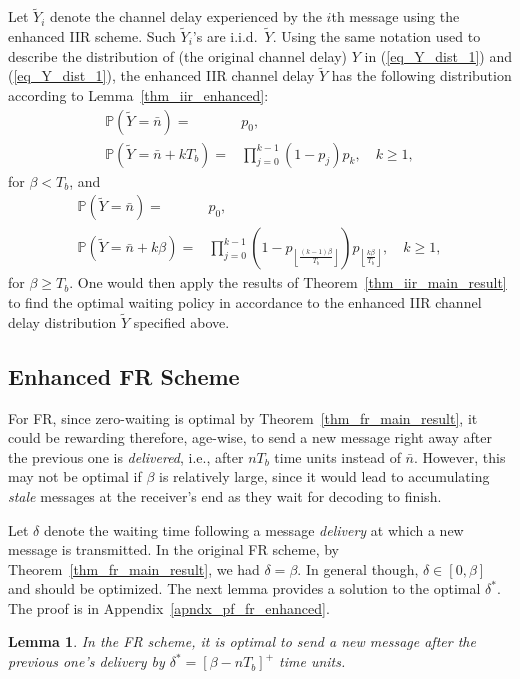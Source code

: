 \documentclass[12pt,journal,onecolumn]{IEEEtran}
\newtheorem{lemma}{Lemma}
\begin{document}
Let $\tilde{Y}_i$ denote the channel delay experienced by the $i$th message using the enhanced IIR scheme. Such $\tilde{Y}_i$'s are i.i.d.~$\tilde{Y}$. Using the same notation used to describe the distribution of (the original channel delay) $Y$ in (\ref{eq_Y_dist_1}) and (\ref{eq_Y_dist_1}), the enhanced IIR channel delay $\tilde{Y}$ has the following distribution according to Lemma~\ref{thm_iir_enhanced}:
\begin{align}
\mathbb{P}\left(\tilde{Y}=\bar{n}\right)=&p_0, \\
\mathbb{P}\left(\tilde{Y}=\bar{n}+kT_b\right)=&\prod_{j=0}^{k-1}(1-p_j)p_k,\quad k\geq1,
\end{align}
for $\beta<T_b$, and
\begin{align}
\mathbb{P}\left(\tilde{Y}=\bar{n}\right)=&p_0, \\
\mathbb{P}\left(\tilde{Y}=\bar{n}+k\beta\right)=&\prod_{j=0}^{k-1}\left(1-p_{\left\lfloor \frac{(k-1)\beta}{T_b} \right\rfloor}\right)p_{\left\lfloor \frac{k\beta}{T_b} \right\rfloor},\quad k\geq1,
\end{align}
for $\beta\geq T_b$. One would then apply the results of Theorem~\ref{thm_iir_main_result} to find the optimal waiting policy in accordance to the enhanced IIR channel delay distribution $\tilde{Y}$ specified above.


\subsection{Enhanced FR Scheme}

For FR, since zero-waiting is optimal by Theorem~\ref{thm_fr_main_result}, it could be rewarding therefore, age-wise, to send a new message right away after the previous one is {\it delivered}, i.e., after $nT_b$ time units instead of $\bar{n}$. However, this may not be optimal if $\beta$ is relatively large, since it would lead to accumulating {\it stale} messages at the receiver's end as they wait for decoding to finish. 

Let $\delta$ denote the waiting time following a message {\it delivery} at which a new message is transmitted. In the original FR scheme, by Theorem~\ref{thm_fr_main_result}, we had $\delta=\beta$. In general though, $\delta\in[0,\beta]$ and should be optimized. The next lemma provides a solution to the optimal $\delta^*$. The proof is in Appendix~\ref{apndx_pf_fr_enhanced}.

\begin{lemma} \label{thm_fr_enhanced}
In the FR scheme, it is optimal to send a new message after the previous one's delivery by $\delta^*=\left[\beta-nT_b\right]^+$ time units.
\end{lemma}
\end{document}
